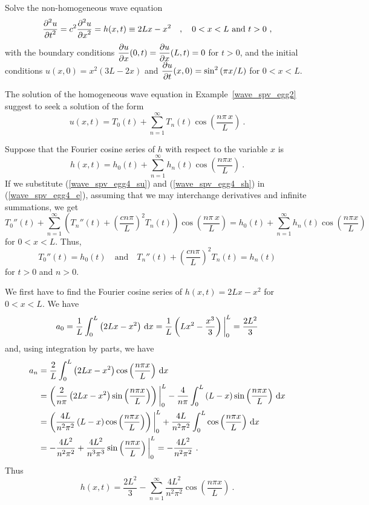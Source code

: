 \begin{egg}
Solve the non-homogeneous wave equation
\begin{equation} \label{wave_spv_egg4_e}
\frac{\displaystyle \partial^{2}{u}} {\displaystyle \partial t^{2}} = c^2 \frac{\displaystyle \partial^{2}{u}} {\displaystyle \partial x^{2}} = h(x,t) \equiv 2Lx-x^2 \quad ,
\quad 0 < x < L \text{ and } t>0 \ ,
\end{equation}
with the boundary conditions
$\displaystyle \frac{\partial{u}}{\partial x}(0,t) = \frac{\partial{u}}{\partial x}(L,t) = 0$ for
$t>0$, and the initial conditions
$\displaystyle u(x,0) = x^2(3L-2x)$ and
$\displaystyle \frac{\partial{u}}{\partial t}(x,0) = \sin^2\left(\pi x/L\right)$ for
$0<x<L$.

The solution of the homogeneous wave equation in
Example~\ref{wave_spv_egg2} suggest to seek a solution of the form
\begin{equation} \label{wave_spv_egg4_su}
u(x,t) = T_0(t) + \sum_{n=1}^\infty T_n(t)
\cos\left(\frac{n\pi\,x}{L}\right) \ .
\end{equation}

Suppose that the Fourier cosine series of $h$ with respect to the
variable $x$ is
\begin{equation} \label{wave_spv_egg4_sh}
h(x,t) = h_0(t) +  \sum_{n=1}^\infty h_n(t) \cos\left(\frac{n\pi x}{L}\right) \ .
\end{equation}
If we substitute (\ref{wave_spv_egg4_su}) and (\ref{wave_spv_egg4_sh}) in
(\ref{wave_spv_egg4_e}), assuming that we may interchange derivatives and
infinite summations, we get
\[
T_0''(t) + \sum_{n=1}^\infty \left( T_n''(t) +
\left(\frac{c n\pi}{L}\right)^2 T_n(t) \right)
\cos\left(\frac{n\pi\,x}{L}\right) =
h_0(t) +  \sum_{n=1}^\infty h_n(t) \cos\left(\frac{n\pi x}{L}\right)
\]
for $0<x<L$.  Thus,
\[
T_0''(t)  = h_0(t) \quad \text{and} \quad
T_n''(t) + \left(\frac{c n\pi}{L}\right)^2 T_n(t) = h_n(t)
\]
for $t>0$ and $n>0$.

We first have to find the Fourier cosine series of
$\displaystyle h(x,t) = 2Lx-x^2$ for $0<x<L$.  We have
\[
a_0 = \frac{1}{L}\int_0^L \left( 2Lx-x^2 \right) \,\mathrm{d}{x}
= \frac{1}{L} \left( Lx^2 - \frac{x^3}{3} \right)\bigg|_0^L = \frac{2L^2}{3}
\]
and, using integration by parts, we have
\begin{align*}
a_n &= \frac{2}{L} \int_0^L \left(2Lx-x^2\right)
\cos\left(\frac{n\pi x}{L}\right)\,\mathrm{d}{x} \\
&= \left( \frac{2}{n\pi} \left(2Lx-x^2\right)
\sin\left(\frac{n\pi x}{L}\right)\right)\bigg|_0^L
- \frac{4}{n\pi} \int_0^L \left(L-x\right)
\sin\left(\frac{n\pi x}{L}\right) \,\mathrm{d}{x} \\
&= \left( \frac{4L}{n^2\pi^2} \left(L-x\right)
\cos\left(\frac{n\pi x}{L}\right) \right)\bigg|_0^L 
+ \frac{4L}{n^2\pi^2} \int_0^L \cos\left(\frac{n\pi x}{L}\right)
\,\mathrm{d}{x} \\
&= -\frac{4L^2}{n^2\pi^2}
+ \frac{4L^2}{n^3\pi^3} \sin\left(\frac{n\pi x}{L}\right)\bigg|_0^L
= -\frac{4L^2}{n^2\pi^2} \ .
\end{align*}
Thus
\[
h(x,t) = \frac{2L^2}{3} - \sum_{n=1}^\infty \frac{4L^2}{n^2\pi^2}
\cos\left(\frac{n\pi x}{L}\right) \ .
\]


\end{egg}
